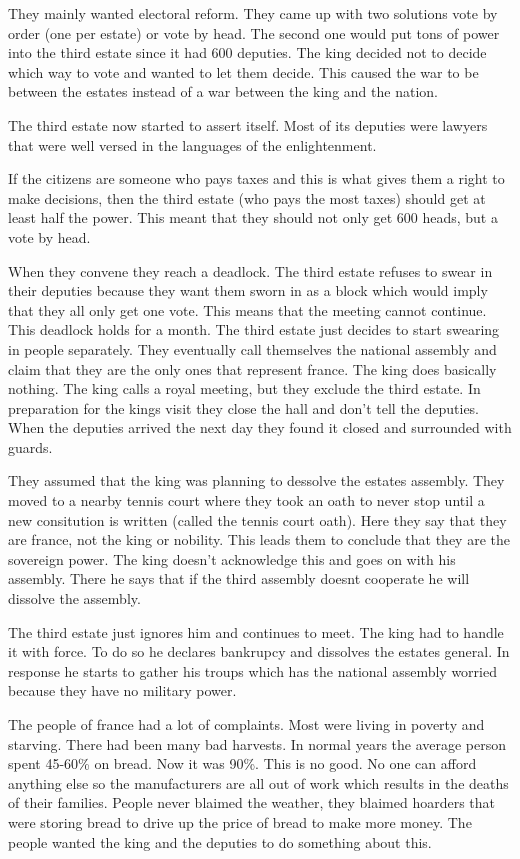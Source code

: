 \documentclass{article}
\begin{document}
They mainly wanted electoral reform. They came up with two solutions vote by order (one per estate) or vote by head. The second one would put tons of power into the third estate since it had 600 deputies. The king decided not to decide which way to vote and wanted to let them decide. This caused the war to be between the estates instead of a war between the king and the nation.

The third estate now started to assert itself. Most of its deputies were lawyers that were well versed in the languages of the enlightenment.

If the citizens are someone who pays taxes and this is what gives them a right to make decisions, then the third estate (who pays the most taxes) should get at least half the power. This meant that they should not only get 600 heads, but a vote by head.

When they convene they reach a deadlock. The third estate refuses to swear in their deputies because they want them sworn in as a block which would imply that they all only get one vote. This means that the meeting cannot continue. This deadlock holds for a month. The third estate just decides to start swearing in people separately. They eventually call themselves the national assembly and claim that they are the only ones that represent france. The king does basically nothing. The king calls a royal meeting, but they exclude the third estate. In preparation for the kings visit they close the hall and don't tell the deputies. When the deputies arrived the next day they found it closed and surrounded with guards.

They assumed that the king was planning to dessolve the estates assembly. They moved to a nearby tennis court where they took an oath to never stop until a new consitution is written (called the tennis court oath). Here they say that they are france, not the king or nobility. This leads them to conclude that they are the sovereign power. The king doesn't acknowledge this and goes on with his assembly. There he says that if the third assembly doesnt cooperate he will dissolve the assembly.

The third estate just ignores him and continues to meet. The king had to handle it with force. To do so he declares bankrupcy and dissolves the estates general. In response he starts to gather his troups which has the  national assembly worried because they have no military power.

The people of france had a lot of complaints. Most were living in poverty and starving. There had been many bad harvests. In normal years the average person spent 45-60\% on bread. Now it was 90\%. This is no good. No one can afford anything else so the manufacturers are all out of work which results in the deaths of their families. People never blaimed the weather, they blaimed hoarders that were storing bread to drive up the price of bread to make more money. The people wanted the king and the deputies to do something about this.
\end{document}

